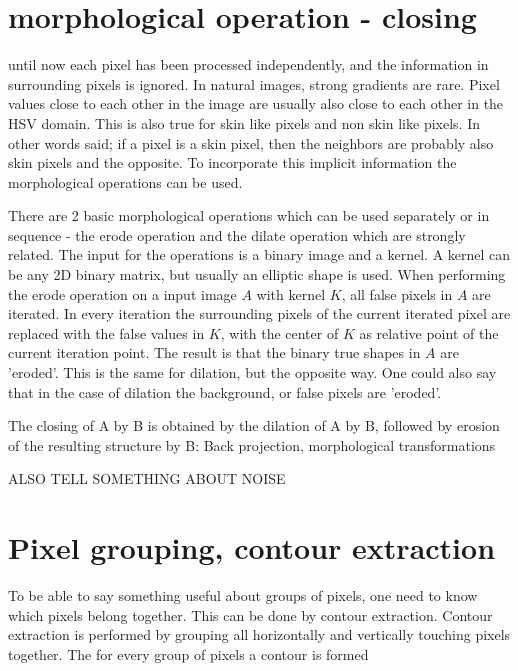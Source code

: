 \section{morphological operation - closing}
until now each pixel has been processed independently, and the information in surrounding pixels is ignored. In natural images, strong gradients are rare. Pixel values close to each other in the image are usually also close to each other in the HSV domain. This is also true for skin like pixels and non skin like pixels. In other words said; if a pixel is a skin pixel, then the neighbors are probably also skin pixels and the opposite. To incorporate this implicit information the morphological operations can be used.

There are 2 basic morphological operations which can be used separately or in sequence - the erode operation and the dilate operation which are strongly related. The input for the operations is a binary image and a kernel. A kernel can be any 2D binary matrix, but usually an elliptic shape is used. When performing the erode operation on a input image $A$ with kernel $K$, all false pixels in $A$ are iterated. In every iteration the surrounding pixels of the current iterated pixel are replaced with the false values in $K$, with the center of $K$ as relative point of the current iteration point. The result is that the binary true shapes in $A$ are 'eroded'. This is the same for dilation, but the opposite way. One could also say that in the case of dilation the background, or false pixels are 'eroded'.

The closing of A by B is obtained by the dilation of A by B, followed by erosion of the resulting structure by B:
Back projection, morphological transformations

ALSO TELL SOMETHING ABOUT NOISE

\section{Pixel grouping, contour extraction}
To be able to say something useful about groups of pixels, one need to know which pixels belong together. This can be done by contour extraction\cite{Suzuki85}. Contour extraction is performed by grouping all horizontally and vertically touching pixels together. The for every group of pixels a contour is formed

